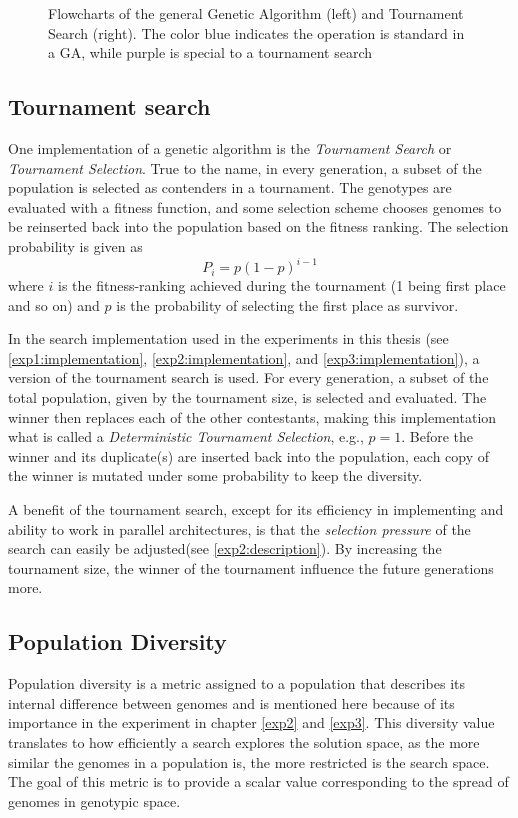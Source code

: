 \begin{figure}[ht]
\begin{subfigure}[ht]{0.25\linewidth}
    \end{subfigure}
    \caption[Algorithm flowcharts]{Flowcharts of the general Genetic Algorithm (left) and Tournament Search (right). The color blue indicates the operation is standard in a GA, while purple is special to a tournament search}
    \label{fig:algorithmflowcharts}
\end{figure}

\subsection{Tournament search}
One implementation of a genetic algorithm is the \textit{Tournament Search} or \textit{Tournament Selection}. True to the name, in every generation, a subset of the population is selected as contenders in a tournament. The genotypes are evaluated with a fitness function, and some selection scheme chooses genomes to be reinserted back into the population based on the fitness ranking. The selection probability is given as 
\begin{equation}
    \label{eq:tournamentsearch}
    P_{i} = p(1-p)^{i-1}
\end{equation}
where \(i\) is the fitness-ranking achieved during the tournament (1 being first place and so on) and \(p\) is the probability of selecting the first place as survivor.  

In the search implementation used in the experiments in this thesis (see \ref{exp1:implementation}, \ref{exp2:implementation}, and \ref{exp3:implementation}), a version of the tournament search is used. For every generation, a subset of the total population, given by the tournament size, is selected and evaluated. The winner then replaces each of the other contestants, making this implementation what is called a \textit{Deterministic Tournament Selection}, e.g., \(p=1\). Before the winner and its duplicate(s) are inserted back into the population, each copy of the winner is mutated under some probability to keep the diversity. 

A benefit of the tournament search, except for its efficiency in implementing and ability to work in parallel architectures, is that the \textit{selection pressure} of the search can easily be adjusted(see \ref{exp2:description}). By increasing the tournament size, the winner of the tournament influence the future generations more.

\subsection{Population Diversity}
\label{background:diversity}
Population diversity is a metric assigned to a population that describes its internal difference between genomes and is mentioned here because of its importance in the experiment in chapter \ref{exp2} and \ref{exp3}. This diversity value translates to how efficiently a search explores the solution space, as the more similar the genomes in a population is, the more restricted is the search space. The goal of this metric is to provide a scalar value corresponding to the spread of genomes in genotypic space. 

